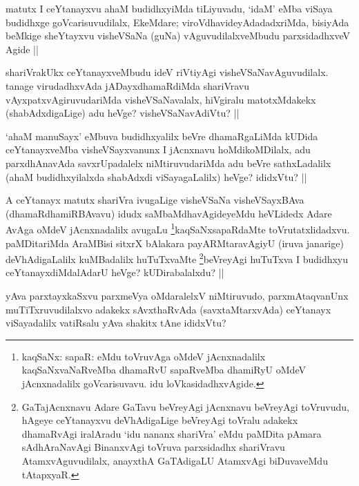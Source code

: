 \begin{artha}
matutx I ceYtanayxvu ahaM budidhxyiMda tiLiyuvadu, `idaM' eMba viSaya budidhxge goVcarisuvudilalx, EkeMdare; viroVdhavideyAdadadxriMda, bisiyAda beMkige sheYtayxvu visheVSaNa (guNa) vAguvudilalxveMbudu parxsidadhxveV Agide ||
\end{artha}

\begin{artha}
shariVrakUkx ceYtanayxveMbudu ideV riVtiyAgi visheVSaNavAguvudilalx. tanage virudadhxvAda jADayxdhamaRdiMda  shariVravu vAyxpatxvAgiruvudariMda visheVSaNavalalx, hiVgiralu matotxMdakekx (shabAdxdigaLige) adu heVge? visheVSaNavAdiVtu? ||
\end{artha}

\begin{artha}
`ahaM manuSayx' eMbuva budidhxyalilx beVre dhamaRgaLiMda kUDida ceYtanayxveMba visheVSayxvanunx I jAcnxnavu hoMdikoMDilalx, adu parxdhAnavAda savxrUpadalelx niMtiruvudariMda adu beVre sathxLadalilx (ahaM budidhxyilalxda shabAdxdi viSayagaLalilx) heVge? ididxVtu? ||
\end{artha}

\begin{artha}
A ceYtanayx matutx shariVra ivugaLige visheVSaNa visheVSayxBAva (dhamaRdhamiRBAvavu) idudx saMbaMdhavAgideyeMdu heVLidedx Adare AvAga oMdeV jAcnxnadalilx avugaLu \footnote{kaqSaNx: sapaR: eMdu toVruvAga oMdeV jAcnxnadalilx kaqSaNxvaNaRveMba dhamaRvU sapaRveMba dhamiRyU oMdeV jAcnxnadalilx goVcarisuvavu. idu loVkasidadhxvAgide.}kaqSaNxsapaRdaMte toVrutatxlidadxvu. paMDitariMda AraMBisi sitxrX bAlakara payARMtaravAgiyU (iruva janarige) deVhAdigaLalilx kuMBadalilx huTuTxvaMte \footnote{GaTajAcnxnavu Adare GaTavu beVreyAgi jAcnxnavu beVreyAgi toVruvudu, hAgeye ceYtanayxvu deVhAdigaLige beVreyAgi toVralu adakekx dhamaRvAgi iralAradu `idu nananx shariVra' eMdu paMDita pAmara sAdhAraNavAgi BinanxvAgi toVruva parxsidadhx shariVravu AtamxvAguvudilalx, anayxthA GaTAdigaLU AtamxvAgi biDuvaveMdu tAtapxyaR.}beVreyAgi huTuTxva I budidhxyu ceYtanayxdiMdalAdarU heVge? kUDirabalalxdu? ||
\end{artha}

\begin{artha}
yAva parxtayxkaSxvu parxmeVya oMdaralelxV niMtiruvudo, parxmAtaqvanUnx muTiTxruvudilalxvo adakekx sAvxthaRvAda (savxtaMtarxvAda) ceYtanayx viSayadalilx vatiRsalu yAva shakitx tAne ididxVtu?
\end{artha}

